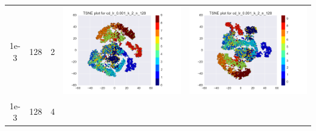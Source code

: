 \documentclass[12pt]{report}
\begin{document}
\begin{table}[H]
\begin{tabular}{ | c | c | c | c || c |}
\begin{minipage}{.3\textwidth}
    \end{minipage}
    \\ \hline
    1e-3 & 128 & 2 &
    \begin{minipage}{.3\textwidth}
      \includegraphics[scale=0.25]{cd_lr_0_001_k_2_n_128.png}
    \end{minipage} &
    \begin{minipage}{.3\textwidth}
      \includegraphics[scale=0.25]{test_cd_lr_0_001_k_2_n_128.png}
    \end{minipage}
    \\ \hline
    1e-3 & 128 & 4 &
    \begin{minipage}{.3\textwidth}

\end{minipage}
\end{tabular}
\end{table}
\end{document}
